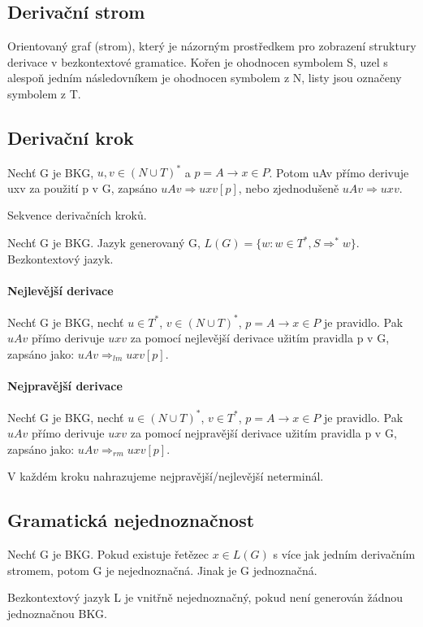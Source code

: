 \documentclass[a4paper, 11pt]{report}
\begin{document}
\subsection{Derivační strom}

Orientovaný graf (strom), který je názorným prostředkem pro zobrazení struktury derivace v bezkontextové gramatice. Kořen je ohodnocen symbolem S, uzel s alespoň jedním následovníkem je ohodnocen symbolem z N, listy jsou označeny symbolem z T.


\subsection{Derivační krok}
Nechť G je BKG, $u,v \in (N \cup T)^*$ a $p = A \to x \in P$. Potom uAv přímo derivuje uxv za použití p v G, zapsáno $uAv \Rightarrow uxv [p]$, nebo zjednodušeně $uAv \Rightarrow uxv$.

Sekvence derivačních kroků.

Nechť G je BKG. Jazyk generovaný G, $L(G) = \{ w: w \in T^*, S \Rightarrow^* w\}$. Bezkontextový jazyk.

\paragraph{Nejlevější derivace}
Nechť G je BKG, nechť $u \in T^*$, $v \in (N \cup T)^*$, $p = A \to x \in P$ je pravidlo. Pak $uAv$ přímo derivuje $uxv$ za pomocí nejlevější derivace užitím pravidla p v G, zapsáno jako: $uAv \Rightarrow_{lm} uxv [p]$.

\paragraph{Nejpravější derivace}
Nechť G je BKG, nechť $u \in (N \cup T)^*$, $v \in T^*$, $p = A \to x \in P$ je pravidlo. Pak $uAv$ přímo derivuje $uxv$ za pomocí nejpravější derivace užitím pravidla p v G, zapsáno jako: $uAv \Rightarrow_{rm} uxv [p]$.

V každém kroku nahrazujeme nejpravější/nejlevější neterminál.

\subsection{Gramatická nejednoznačnost}

Nechť G je BKG. Pokud existuje řetězec $x \in L(G)$ s více jak jedním derivačním stromem, potom G je nejednoznačná. Jinak je G jednoznačná.

Bezkontextový jazyk L je vnitřně nejednoznačný, pokud není generován žádnou jednoznačnou BKG.
\end{document}
